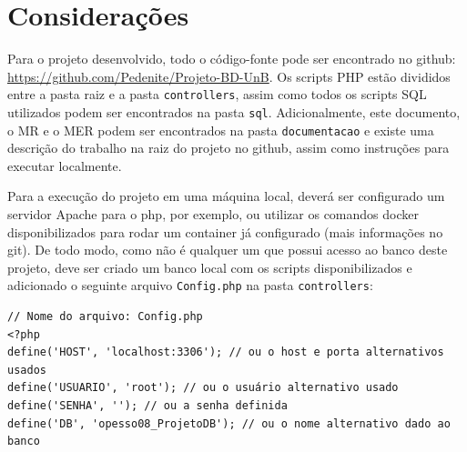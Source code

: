 \documentclass[12pt]{article}
\begin{document}
\section*{Considerações}
Para o projeto desenvolvido, todo o código-fonte pode ser encontrado no github: \url{https://github.com/Pedenite/Projeto-BD-UnB}. Os scripts PHP estão divididos entre a pasta raiz e a pasta \texttt{controllers}, assim como todos os scripts SQL utilizados podem ser encontrados na pasta \texttt{sql}. Adicionalmente, este documento, o MR e o MER podem ser encontrados na pasta \texttt{documentacao} e existe uma descrição do trabalho na raiz do projeto no github, assim como instruções para executar localmente.

Para a execução do projeto em uma máquina local, deverá ser configurado um servidor Apache para o php, por exemplo, ou utilizar os comandos docker disponibilizados para rodar um container já configurado (mais informações no git). De todo modo, como não é qualquer um que possui acesso ao banco deste projeto, deve ser criado um banco local com os scripts disponibilizados e adicionado o seguinte arquivo \texttt{Config.php} na pasta \texttt{controllers}:

\begin{lstlisting}
// Nome do arquivo: Config.php
<?php
define('HOST', 'localhost:3306'); // ou o host e porta alternativos usados 
define('USUARIO', 'root'); // ou o usuário alternativo usado
define('SENHA', ''); // ou a senha definida
define('DB', 'opesso08_ProjetoDB'); // ou o nome alternativo dado ao banco
\end{lstlisting}
\end{document}
